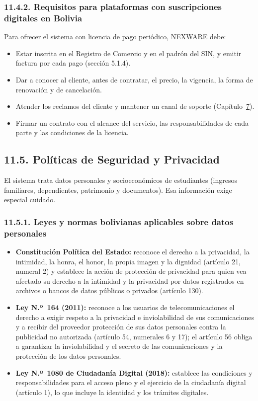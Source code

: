 \subsubsection{11.4.2. Requisitos para plataformas con suscripciones digitales en Bolivia}

Para ofrecer el sistema con licencia de pago periódico, NEXWARE debe:

\begin{itemize}
    \item Estar inscrita en el Registro de Comercio y en el padrón del SIN, y emitir factura por cada pago (sección 5.1.4).
    \item Dar a conocer al cliente, antes de contratar, el precio, la vigencia, la forma de renovación y de cancelación.
    \item Atender los reclamos del cliente y mantener un canal de soporte (Capítulo~\hyperref[cap:sitio_web]{7}).
    \item Firmar un contrato con el alcance del servicio, las responsabilidades de cada parte y las condiciones de la licencia.
\end{itemize}

\subsection{11.5. Políticas de Seguridad y Privacidad}

El sistema trata datos personales y socioeconómicos de estudiantes (ingresos familiares, dependientes, patrimonio y documentos). Esa información exige especial cuidado.

\subsubsection{11.5.1. Leyes y normas bolivianas aplicables sobre datos personales}

\begin{itemize}
    \item \textbf{Constitución Política del Estado:} reconoce el derecho a la privacidad, la intimidad, la honra, el honor, la propia imagen y la dignidad (artículo 21, numeral 2) y establece la acción de protección de privacidad para quien vea afectado su derecho a la intimidad y la privacidad por datos registrados en archivos o bancos de datos públicos o privados (artículo 130).
    \item \textbf{Ley N.º~164 (2011):} reconoce a los usuarios de telecomunicaciones el derecho a exigir respeto a la privacidad e inviolabilidad de sus comunicaciones y a recibir del proveedor protección de sus datos personales contra la publicidad no autorizada (artículo 54, numerales 6 y 17); el artículo 56 obliga a garantizar la inviolabilidad y el secreto de las comunicaciones y la protección de los datos personales.
    \item \textbf{Ley N.º~1080 de Ciudadanía Digital (2018):} establece las condiciones y responsabilidades para el acceso pleno y el ejercicio de la ciudadanía digital (artículo 1), lo que incluye la identidad y los trámites digitales.
\end{itemize}

